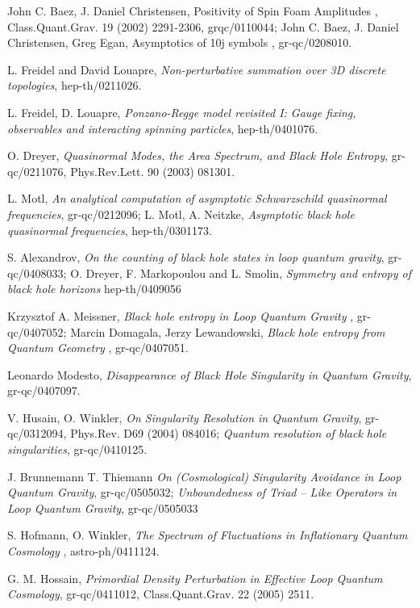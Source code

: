 \documentclass[12pt]{article}
\begin{document}
\begin{thebibliography}{0}
{{{John C. Baez, J. Daniel Christensen,
Positivity of Spin Foam Amplitudes , Class.Quant.Grav. 19 (2002) 2291-2306,
grqc/0110044; John C. Baez, J. Daniel Christensen,
Greg Egan, Asymptotics of 10j symbols , gr-qc/0208010.

L. Freidel and David Louapre,  
{\it  Non-perturbative summation over 3D discrete topologies}, 
hep-th/0211026.


L. Freidel, D. Louapre,
{\it Ponzano-Regge model revisited I: Gauge fixing, observables and 
interacting spinning particles}, 
hep-th/0401076. 

O. Dreyer, 
{\it Quasinormal Modes, the Area Spectrum, and Black Hole Entropy},
 gr-qc/0211076, Phys.Rev.Lett. 90 (2003) 081301.

L. Motl,
{\it An analytical computation of asymptotic Schwarzschild quasinormal 
frequencies},
gr-qc/0212096; L. Motl, A. Neitzke,
{\it Asymptotic black hole quasinormal frequencies},
hep-th/0301173.

S. Alexandrov, {\it On the counting of black hole states in loop quantum gravity}, gr-qc/0408033; O. Dreyer, F. Markopoulou and L. Smolin, 
{\it Symmetry and entropy of black hole horizons}
hep-th/0409056

Krzysztof A. Meissner, 
{ \it   Black hole entropy in Loop Quantum Gravity }, gr-qc/0407052;
Marcin Domagala, Jerzy Lewandowski, {\it  
Black hole entropy from Quantum Geometry  },
gr-qc/0407051.

Leonardo Modesto,
{\it   Disappearance of Black Hole Singularity in Quantum Gravity},
 gr-qc/0407097.

V. Husain, O. Winkler, 
{\it  On Singularity Resolution in Quantum Gravity},
gr-qc/0312094, Phys.Rev. D69 (2004) 084016; 
{\it Quantum resolution of black hole singularities}, 
gr-qc/0410125. 

J.  Brunnemann T.  Thiemann
{\it On (Cosmological) Singularity Avoidance in Loop Quantum Gravity}, 
gr-qc/0505032; {\it Unboundedness of Triad -- Like Operators in Loop Quantum Gravity},  gr-qc/0505033 

S. Hofmann, O. Winkler,
{\it The Spectrum of Fluctuations in Inflationary Quantum Cosmology }, 
astro-ph/0411124. 


G. M.  Hossain,
{\it Primordial Density Perturbation in Effective Loop Quantum Cosmology}, 
gr-qc/0411012,  Class.Quant.Grav. 22 (2005) 2511. 


}}}
\end{thebibliography}
\end{document}
